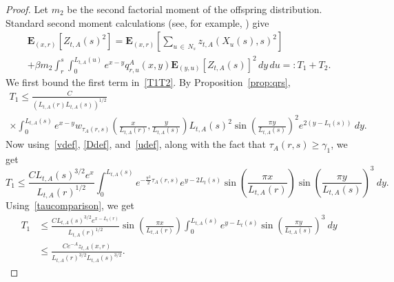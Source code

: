 \documentclass[AHL,Unicode,longabstracts,published]{cedram}
\newcommand*\E{\mathbf{E}}
\newcommand{\1} {\mathds{1}}
\begin{document}
\begin{proof}
Let $m_2$ be the second factorial moment of the offspring distribution. Standard second moment calculations (see, for example, \cite[p.~146]{inw}) give
\begin{multline}\label{T1T2}
\E_{(x,r)}\left[Z_{t,A}(s)^2\right] 
= \E_{(x,r)}\left[\sum_{u\,\in\,N_s} z_{t,A}(X_u(s),s)^2\right]\\
+ \beta m_2 \int_r^s \int_0^{L_{t,A}(u)} e^{x-y}q^A_{r,u}(x,y)\E_{(y,u)}\left[Z_{t,A}(s)\right]^2\,dy\, du 
=: T_1 + T_2.
\end{multline}
We first bound the first term in~\eqref{T1T2}. By Proposition~\ref{prop:qrs},
\begin{multline*}
T_1 \leq \frac{C}{\left(L_{t,A}(r) L_{t,A}(s)\right)^{1/2}} \\
\times \int_0^{L_{t,A}(s)} e^{x-y} w_{\tau_A(r,s)} \left(\frac{x}{L_{t,A}(r)}, \frac{y}{L_{t,A}(s)} \right) L_{t,A}(s)^2 \sin \left(\frac{\pi y}{L_{t,A}(s)} \right)^2 e^{2(y - L_t(s))} \: dy.
\end{multline*}
Now using~\eqref{vdef}, \eqref{Ddef}, and~\eqref{udef}, along with the fact that $\tau_A(r,s) \geq \gamma_1$, we get
\[
T_1 \leq \frac{C L_{t,A}(s)^{3/2} e^{x}}{L_{t,A}(r)^{1/2}} \int_0^{L_{t,A}(s)} e^{-\frac{\pi^2}{2} \tau_A(r,s)} e^{y - 2 L_t(s)} \sin \left(\frac{\pi x}{L_{t,A}(r)} \right) \sin \left(\frac{\pi y}{L_{t,A}(s)} \right)^3 \: dy.
\]
Using~\eqref{taucomparison}, we get
\begin{equation}\label{T1}
\begin{split}
T_1 &\leq \frac{C L_{t,A}(s)^{3/2} e^{x - L_t(r)}}{L_{t,A}(r)^{1/2}} \sin \left(\frac{\pi x}{L_{t,A}(r)} \right) \int_0^{L_{t,A}(s)} e^{y-L_t(s)} \sin \left(\frac{\pi y}{L_{t,A}(s)} \right)^3 \: dy \\
&\leq \frac{C e^{-A} z_{t,A}(x,r)}{L_{t,A}(r)^{3/2} L_{t,A}(s)^{3/2}}.
\end{split}
\end{equation}


\end{proof}
\end{document}
